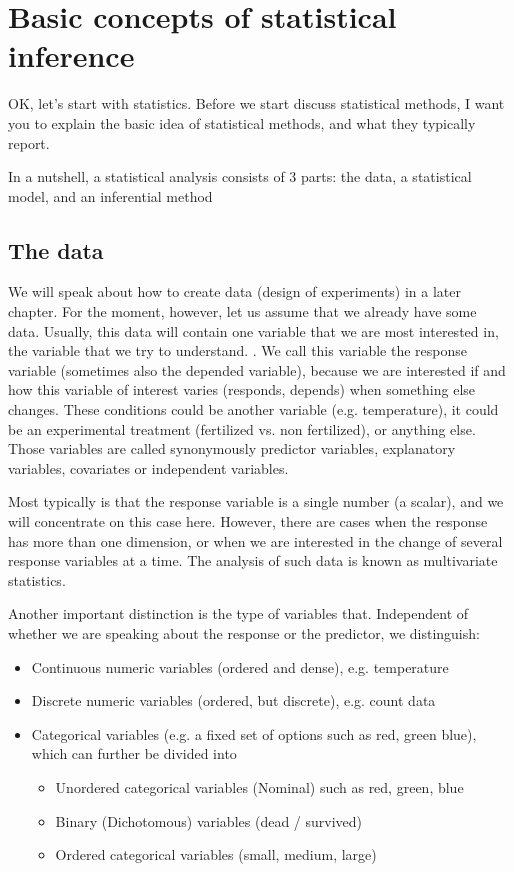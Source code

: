 \documentclass[a4paper,twoside]{tufte-book} %
\begin{document}
\chapter{Basic concepts of statistical inference}

OK, let's start with statistics. Before we start discuss statistical methods, I want you to explain the basic idea of statistical methods, and what they typically report. 

In a nutshell, a statistical analysis consists of 3 parts: the data, a statistical model, and an inferential method

\section{The data}

We will speak about how to create data (design of experiments) in a later chapter. For the moment, however, let us assume that we already have some data. Usually, this data will contain one variable that we are most interested in, the variable that we try to understand. . We call this variable the response variable (sometimes also the depended variable), because we are interested if and how this variable of interest varies (responds, depends) when something else changes. These conditions could be another variable (e.g. temperature), it could be an experimental treatment (fertilized vs. non fertilized), or anything else.  Those variables are called synonymously predictor variables, explanatory variables, covariates or independent variables. 

Most typically is that the response variable is a single number (a scalar), and we will concentrate on this case here. However, there are cases when the response has more than one dimension, or when we are interested in the change of several response variables at a time. The analysis of such data is known as multivariate statistics.

Another important distinction is the type of variables that. Independent of whether we are speaking about the response or the predictor, we distinguish:

\begin{itemize}
\item Continuous numeric variables (ordered and dense), e.g. temperature
\item Discrete numeric variables (ordered, but discrete), e.g. count data
\item Categorical variables (e.g. a fixed set of options such as red, green blue), which can further be divided into
\begin{itemize}
\item Unordered categorical variables (Nominal) such as red, green, blue 
\item Binary (Dichotomous) variables (dead / survived)
\item Ordered categorical variables (small, medium, large)
\end{itemize}
\end{itemize}
\end{document}
